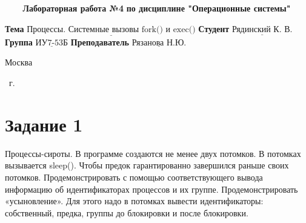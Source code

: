 \documentclass[a4paper,14pt]{article}
\begin{document}
\begin{center}
	\noindent\begin{minipage}{1.3\textwidth}\centering
	\Large\textbf{   ~~~ Лабораторная работа №4}\newline
	\textbf{по дисциплине "Операционные системы"}\newline\newline\newline
	\end{minipage}
\end{center}

\noindent\textbf{Тема} $\underline{\text{Процессы. Системные вызовы fork() и exec()}}$\newline\newline
\noindent\textbf{Студент} $\underline{\text{Рядинский К. В.}}$\newline\newline
\noindent\textbf{Группа} $\underline{\text{ИУ7-53Б}}$\newline\newline
\noindent\textbf{Преподаватель} $\underline{\text{Рязанова Н.Ю.}}$\newline

\begin{center}
	\mbox{}
	\vfill
	Москва
\end{center}

\begin{center}
	\the\year ~г.
\end{center}
\clearpage

\section*{Задание 1}

Процессы-сироты. В программе создаются не менее двух потомков. В потомках вызывается sleep(). Чтобы предок гарантированно завершился раньше своих потомков. Продемонстрировать с помощью соответствующего вывода информацию об идентификаторах процессов и их группе. Продемонстрировать «усыновление». Для этого надо в потомках вывести идентификаторы: собственный, предка, группы до блокировки и после блокировки.
\end{document}
